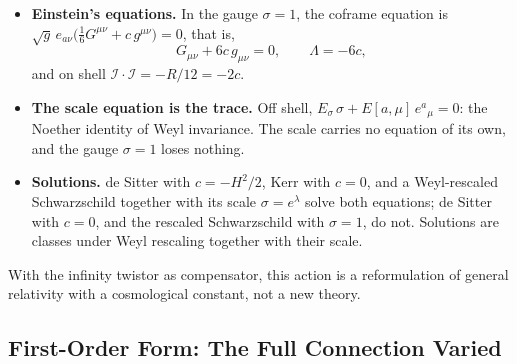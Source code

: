 \documentclass[11pt,a4paper]{article}
\begin{document}
\begin{itemize}
    \item \textbf{Einstein's equations.} In the gauge \(\sigma=1\), the
    coframe equation is
    \(\sqrt g\,e_{a\nu}\bigl(\tfrac16G^{\mu\nu}+c\,g^{\mu\nu}\bigr)=0\),
    that is,
    \[
        \boxed{
            G_{\mu\nu}+6c\,g_{\mu\nu}=0,
            \qquad
            \Lambda=-6c,
        }
    \]
    and on shell \(\mathcal I\cdot\mathcal I=-R/12=-2c\).

    \item \textbf{The scale equation is the trace.} Off shell,
    \(E_\sigma\,\sigma+E[a,\mu]\,e^a{}_\mu=0\): the Noether identity of
    Weyl invariance. The scale carries no equation of its own, and the
    gauge \(\sigma=1\) loses nothing.

    \item \textbf{Solutions.} de Sitter with \(c=-H^2/2\), Kerr with
    \(c=0\), and a Weyl-rescaled Schwarzschild together with its scale
    \(\sigma=e^\lambda\) solve both equations; de Sitter with \(c=0\),
    and the rescaled Schwarzschild with \(\sigma=1\), do not. Solutions
    are classes under Weyl rescaling together with their scale.
\end{itemize}

With the infinity twistor as compensator, this action is a
reformulation of general relativity with a cosmological constant, not
a new theory.

\subsection{First-Order Form: The Full Connection Varied}
\end{document}
